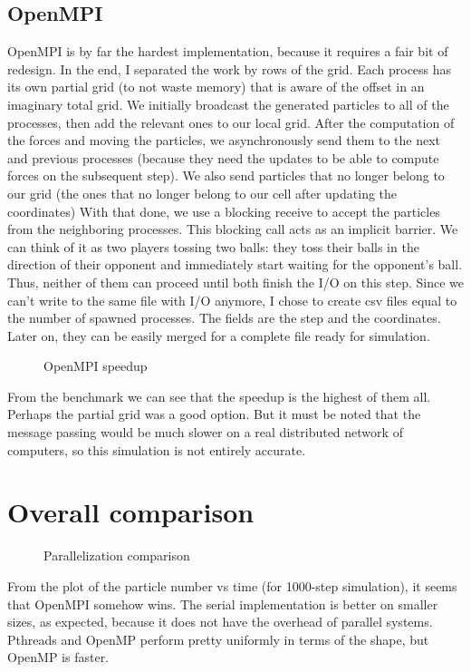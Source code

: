 \documentclass[a4paper,11pt]{article}
\begin{document}
\subsection{OpenMPI}
OpenMPI is by far the hardest implementation, because it requires a fair bit of redesign.
In the end, I separated the work by rows of the grid. Each process has its own
partial grid (to not waste memory) that is aware of the offset in an imaginary
total grid. We initially broadcast the generated particles to all of the processes, then
add the relevant ones to our local grid.
After the computation of the forces and moving the particles, we asynchronously
send them to the next and previous processes (because they need the updates to
be able to compute forces on the subsequent step). We also send particles that
no longer belong to our grid (the ones that no longer belong to our cell after
updating the coordinates)
With that done, we use a blocking receive to accept the particles from the
neighboring processes. This blocking call acts as an implicit barrier.
We can think of it as two players tossing two balls: they toss their balls in
the direction of their opponent and immediately start waiting for the opponent's
ball. Thus, neither of them can proceed until both finish the I/O on this step.
Since we can't write to the same file with I/O anymore, I chose to create csv
files equal to the number of spawned processes.  The fields are the step and the
coordinates. Later on, they can be easily merged for a complete file ready for
simulation.
\begin{figure}[H]
    
    \centering
    \caption{OpenMPI speedup}
\end{figure}
From the benchmark we can see that the speedup is the highest of them all.
Perhaps the partial grid was a good option. But it must be noted that the
message passing would be much slower on a real distributed network of computers,
so this simulation is not entirely accurate.
\section{Overall comparison}
\begin{figure}[H]
    
    \centering
    \caption{Parallelization comparison}
\end{figure}
From the plot of the particle number vs time (for 1000-step simulation), it seems that
OpenMPI somehow wins. The serial implementation is better on smaller sizes, as
expected, because it does not have the overhead of parallel systems.
Pthreads and OpenMP perform pretty uniformly in terms of the shape, but OpenMP
is faster.
\end{document}
